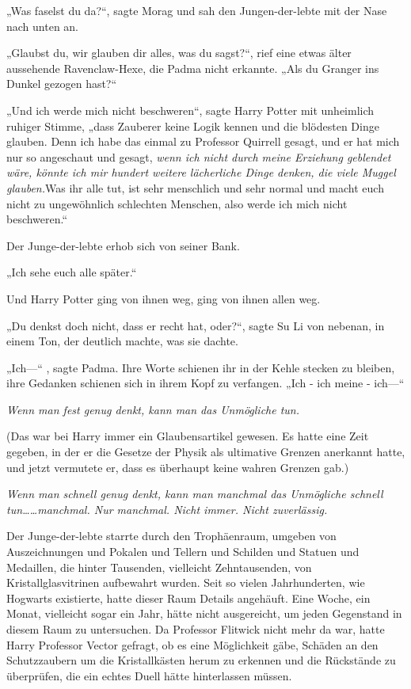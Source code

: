 {„Was faselst du da?“, sagte Morag und sah den Jungen-der-lebte mit der Nase nach unten an.

„Glaubst du, wir glauben dir alles, was du sagst?“, rief eine etwas älter aussehende Ravenclaw-Hexe, die Padma nicht erkannte. „Als du Granger ins Dunkel gezogen hast?“

„Und ich werde mich nicht beschweren“, sagte Harry Potter mit unheimlich ruhiger Stimme, „dass Zauberer keine Logik kennen und die blödesten Dinge glauben. Denn ich habe das einmal zu Professor Quirrell gesagt, und er hat mich nur so angeschaut und gesagt, \emph{wenn ich nicht durch meine Erziehung geblendet wäre, könnte ich mir hundert weitere lächerliche Dinge denken, die viele Muggel glauben.}Was ihr alle tut, ist sehr menschlich und sehr normal und macht euch nicht zu ungewöhnlich schlechten Menschen, also werde ich mich nicht beschweren.“

Der Junge-der-lebte erhob sich von seiner Bank.

„Ich sehe euch alle später.“

Und Harry Potter ging von ihnen weg, ging von ihnen allen weg.

„Du denkst doch nicht, dass er recht hat, oder?“, sagte Su Li von nebenan, in einem Ton, der deutlich machte, was sie dachte.

„Ich—“ , sagte Padma. Ihre Worte schienen ihr in der Kehle stecken zu bleiben, ihre Gedanken schienen sich in ihrem Kopf zu verfangen. „Ich - ich meine - ich—“

\emph{Wenn man fest genug denkt, kann man das Unmögliche tun.}

(Das war bei Harry immer ein Glaubensartikel gewesen. Es hatte eine Zeit gegeben, in der er die Gesetze der Physik als ultimative Grenzen anerkannt hatte, und jetzt vermutete er, dass es überhaupt keine wahren Grenzen gab.)

\emph{Wenn man schnell genug denkt, kann man manchmal das Unmögliche schnell tun……manchmal. Nur manchmal. Nicht immer. Nicht zuverlässig.}

Der Junge-der-lebte starrte durch den Trophäenraum, umgeben von Auszeichnungen und Pokalen und Tellern und Schilden und Statuen und Medaillen, die hinter Tausenden, vielleicht Zehntausenden, von Kristallglasvitrinen aufbewahrt wurden. Seit so vielen Jahrhunderten, wie Hogwarts existierte, hatte dieser Raum Details angehäuft. Eine Woche, ein Monat, vielleicht sogar ein Jahr, hätte nicht ausgereicht, um jeden Gegenstand in diesem Raum zu untersuchen. Da Professor Flitwick nicht mehr da war, hatte Harry Professor Vector gefragt, ob es eine Möglichkeit gäbe, Schäden an den Schutzzaubern um die Kristallkästen herum zu erkennen und die Rückstände zu überprüfen, die ein echtes Duell hätte hinterlassen müssen.

}
